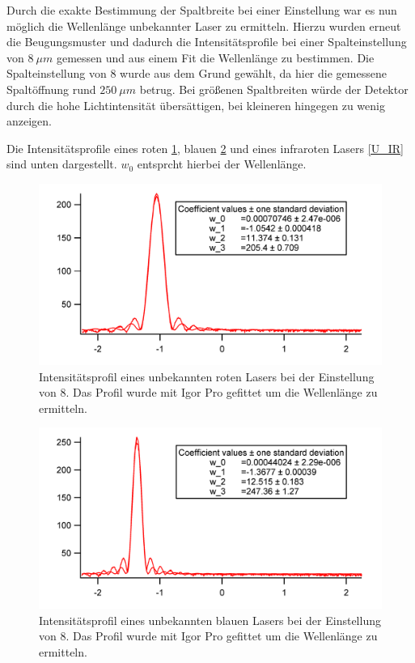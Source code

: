 Durch die exakte Bestimmung der Spaltbreite bei einer Einstellung war es nun möglich die Wellenlänge unbekannter Laser zu  ermitteln. Hierzu wurden erneut die Beugungsmuster und dadurch die Intensitätsprofile bei einer Spalteinstellung von $8~\mu m$ gemessen und aus einem Fit die Wellenlänge zu bestimmen. Die Spalteinstellung von $8$ wurde aus dem Grund gewählt, da hier die gemessene Spaltöffnung rund $250~\mu m$ betrug. Bei größenen Spaltbreiten würde der Detektor durch die hohe Lichtintensität übersättigen, bei kleineren hingegen zu wenig anzeigen.

 Die Intensitätsprofile eines roten \ref{U_Rot}, blauen \ref{U_Blau} und eines infraroten Lasers \ref{U_IR} sind unten dargestellt. $w_0$ entsprcht hierbei der Wellenlänge. 

\begin{figure}[H]
	\centering	
	\begin{minipage}{1\textwidth}
		\includegraphics[width=\columnwidth]{180618/Graph_Rot.png}
	\end{minipage}
	\caption{Intensitätsprofil eines unbekannten roten Lasers bei der Einstellung von $8$. Das Profil wurde mit Igor Pro gefittet um die Wellenlänge zu ermitteln. }
	\label{U_Rot}
\end{figure}
\begin{figure}[H]
	\centering	
	\begin{minipage}{1\textwidth}
		\includegraphics[width=\columnwidth]{180618/Graph_Blau.png}
	\end{minipage}
	\caption{Intensitätsprofil eines unbekannten blauen Lasers bei der Einstellung von $8$. Das Profil wurde mit Igor Pro gefittet um die Wellenlänge zu ermitteln. }
	\label{U_Blau}
\end{figure}
